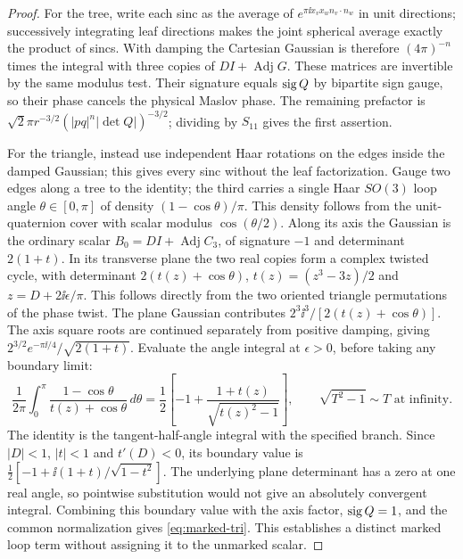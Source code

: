 \begin{proof}
For the tree, write each sinc as the average of \(e^{\pi\ii x_vx_w n_v\cdot n_w}\) in unit directions; successively integrating leaf directions makes the joint spherical average exactly the product of sincs. With damping the Cartesian Gaussian is therefore \((4\pi)^{-n}\) times the integral with three copies of \(DI+\operatorname{Adj}G\). These matrices are invertible by the same modulus test. Their signature equals \(\operatorname{sig} Q\) by bipartite sign gauge, so their phase cancels the physical Maslov phase. The remaining prefactor is \(\sqrt2\pi r^{-3/2}(|pq|^n|\det Q|)^{-3/2}\); dividing by \(S_{11}\) gives the first assertion.

For the triangle, instead use independent Haar rotations on the edges inside the damped Gaussian; this gives every sinc without the leaf factorization. Gauge two edges along a tree to the identity; the third carries a single Haar \(SO(3)\) loop angle \(\theta\in[0,\pi]\) of density \((1-\cos\theta)/\pi\). This density follows from the unit-quaternion cover with scalar modulus \(\cos(\theta/2)\). Along its axis the Gaussian is the ordinary scalar \(B_0=DI+\operatorname{Adj} C_3\), of signature \(-1\) and determinant \(2(1+t)\). In its transverse plane the two real copies form a complex twisted cycle, with determinant \(2(t(z)+\cos\theta)\), \(t(z)=(z^3-3z)/2\) and \(z=D+2\ii\epsilon/\pi\). This follows directly from the two oriented triangle permutations of the phase twist. The plane Gaussian contributes \(2^3\ii^3/[2(t(z)+\cos\theta)]\). The axis square roots are continued separately from positive damping, giving \(2^{3/2}e^{-\pi\ii/4}/\sqrt{2(1+t)}\). Evaluate the angle integral at \(\epsilon>0\), before taking any boundary limit:
\[
 \frac1{2\pi}\int_0^\pi\frac{1-\cos\theta}{t(z)+\cos\theta}\,d\theta
   =\frac12\left[-1+\frac{1+t(z)}{\sqrt{t(z)^2-1}}\right],
 \qquad \sqrt{T^2-1}\sim T\text{ at infinity}.
\]
The identity is the tangent-half-angle integral with the specified branch. Since \(|D|<1\), \(|t|<1\) and \(t'(D)<0\), its boundary value is \(\tfrac12[-1+\ii(1+t)/\sqrt{1-t^2}]\). The underlying plane determinant has a zero at one real angle, so pointwise substitution would not give an absolutely convergent integral. Combining this boundary value with the axis factor, \(\operatorname{sig} Q=1\), and the common normalization gives \eqref{eq:marked-tri}. This establishes a distinct marked loop term without assigning it to the unmarked scalar.
\end{proof}
